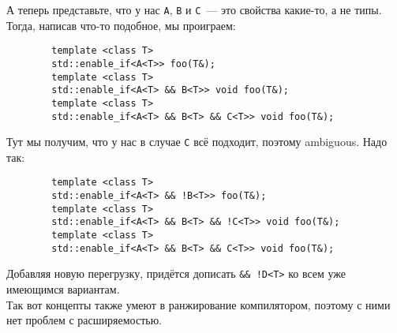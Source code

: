 \documentclass{article}
\begin{document}
    А теперь представьте, что у нас \texttt{A}, \texttt{B} и \texttt{C}~--- это свойства какие-то, а не типы. Тогда, написав что-то подобное, мы проиграем:
    \begin{verbatim}
        template <class T>
        std::enable_if<A<T>> foo(T&);
        template <class T>
        std::enable_if<A<T> && B<T>> void foo(T&);
        template <class T>
        std::enable_if<A<T> && B<T> && C<T>> void foo(T&);
    \end{verbatim}
    Тут мы получим, что у нас в случае \texttt{C} всё подходит, поэтому ambiguous. Надо так:
    \begin{verbatim}
        template <class T>
        std::enable_if<A<T> && !B<T>> foo(T&);
        template <class T>
        std::enable_if<A<T> && B<T> && !C<T>> void foo(T&);
        template <class T>
        std::enable_if<A<T> && B<T> && C<T>> void foo(T&);
    \end{verbatim}
    Добавляя новую перегрузку, придётся дописать \texttt{&& !D<T>} ко всем уже имеющимся вариантам.\\
    Так вот концепты также умеют в ранжирование компилятором, поэтому с ними нет проблем с расширяемостью.
\end{document}
